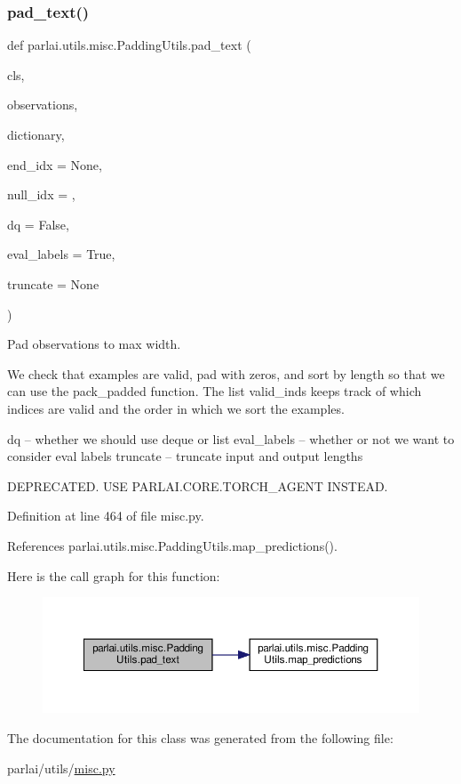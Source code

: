 \subsubsection{\texorpdfstring{pad\+\_\+text()}{pad\_text()}}
{\footnotesize\ttfamily def parlai.\+utils.\+misc.\+Padding\+Utils.\+pad\+\_\+text (\begin{DoxyParamCaption}\item[{}]{cls,  }\item[{}]{observations,  }\item[{}]{dictionary,  }\item[{}]{end\+\_\+idx = {\ttfamily None},  }\item[{}]{null\+\_\+idx = {},  }\item[{}]{dq = {\ttfamily False},  }\item[{}]{eval\+\_\+labels = {\ttfamily True},  }\item[{}]{truncate = {\ttfamily None} }\end{DoxyParamCaption})}

\begin{DoxyVerb}Pad observations to max width.

We check that examples are valid, pad with zeros, and sort by length
so that we can use the pack_padded function. The list valid_inds
keeps track of which indices are valid and the order in which we sort
the examples.

dq -- whether we should use deque or list
eval_labels -- whether or not we want to consider eval labels
truncate -- truncate input and output lengths

DEPRECATED. USE PARLAI.CORE.TORCH_AGENT INSTEAD.
\end{DoxyVerb}
 

Definition at line 464 of file misc.\+py.



References parlai.\+utils.\+misc.\+Padding\+Utils.\+map\+\_\+predictions().

Here is the call graph for this function\+:
\nopagebreak
\begin{figure}[H]
\begin{center}
\leavevmode
\includegraphics[width=350pt]{classparlai_1_1utils_1_1misc_1_1PaddingUtils_acd7178452139c55dc56e9889b10347cc_cgraph}
\end{center}
\end{figure}


The documentation for this class was generated from the following file\+:\begin{DoxyCompactItemize}
\item 
parlai/utils/\hyperlink{misc_8py}{misc.\+py}\end{DoxyCompactItemize}
